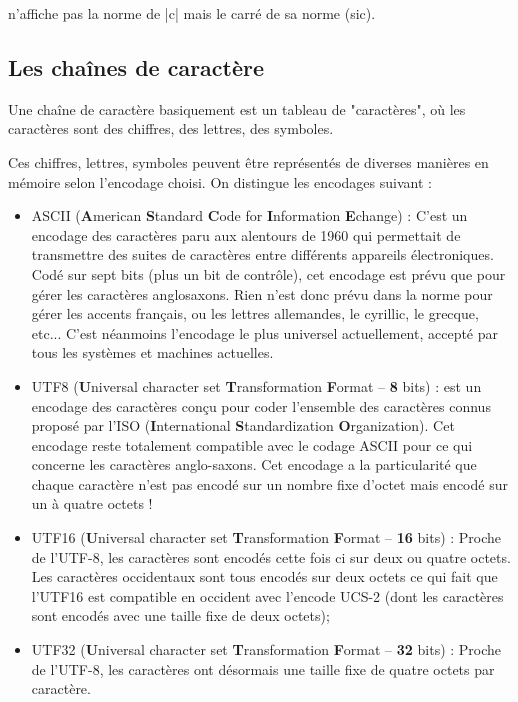 n'affiche pas la norme de |c| mais le carré de sa norme (sic).

\subsection{Les chaînes de caractère}

Une chaîne de caractère basiquement est un tableau de "caractères", où les caractères sont des chiffres, des lettres, des symboles.

Ces chiffres, lettres, symboles peuvent être représentés de diverses manières en mémoire selon l'encodage choisi. On distingue les encodages suivant :
\begin{itemize}
  \item ASCII (\textbf{A}merican \textbf{S}tandard \textbf{C}ode for \textbf{I}nformation \textbf{E}change) : 
  C'est un encodage des caractères paru aux alentours de 1960 qui permettait de transmettre des suites de caractères
  entre différents appareils électroniques. Codé sur sept bits (plus un bit de contrôle), cet encodage est prévu que
  pour gérer les caractères anglosaxons. Rien n'est donc prévu dans la norme pour gérer les accents français, ou les lettres allemandes, le cyrillic, le grecque, etc... C'est néanmoins l'encodage le plus universel actuellement, accepté par tous les systèmes et machines actuelles.
  \item UTF8 (\textbf{U}niversal character set \textbf{T}ransformation \textbf{F}ormat -- \textbf{8} bits) :
  est un encodage des caractères conçu pour coder l'ensemble des caractères connus proposé par l'ISO (\textbf{I}nternational \textbf{S}tandardization \textbf{O}rganization). Cet encodage reste totalement compatible avec le codage ASCII pour ce qui concerne les caractères anglo-saxons. Cet encodage a la particularité que chaque caractère n'est pas encodé sur un nombre fixe d'octet mais encodé sur un à quatre octets !
  \item UTF16 (\textbf{U}niversal character set \textbf{T}ransformation \textbf{F}ormat -- \textbf{16} bits) : Proche de l'UTF-8, les caractères sont encodés cette fois ci sur deux ou quatre octets. Les caractères occidentaux sont tous encodés sur deux octets ce qui fait que l'UTF16 est compatible en occident avec l'encode UCS-2 (dont les caractères sont encodés avec une taille fixe de deux octets);
  \item UTF32 (\textbf{U}niversal character set \textbf{T}ransformation \textbf{F}ormat -- \textbf{32} bits) : Proche de l'UTF-8, les caractères ont désormais une taille fixe de quatre octets par caractère. 
\end{itemize}

